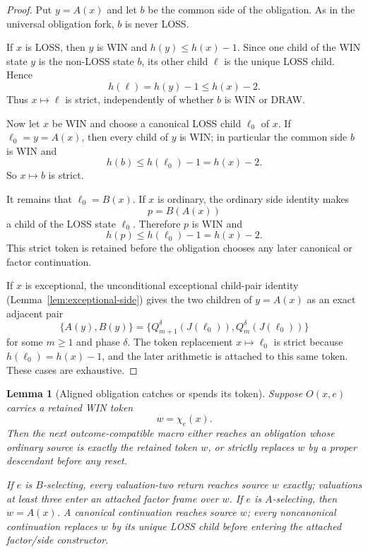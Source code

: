 \documentclass[11pt]{article}
\newtheorem{lemma}[theorem]{Lemma}
\begin{document}
\begin{proof}
Put $y=A(x)$ and let $b$ be the common side of the obligation.  As in the
universal obligation fork, $b$ is never LOSS.

If $x$ is LOSS, then $y$ is WIN and $h(y)\le h(x)-1$.  Since one child of
the WIN state $y$ is the non-LOSS state $b$, its other child $\ell$ is the
unique LOSS child.  Hence
\[
 h(\ell)=h(y)-1\le h(x)-2.
\]
Thus $x\mapsto\ell$ is strict, independently of whether $b$ is WIN or DRAW.

Now let $x$ be WIN and choose a canonical LOSS child $\ell_0$ of $x$.
If $\ell_0=y=A(x)$, then every child of $y$ is WIN; in particular the common
side $b$ is WIN and
\[
 h(b)\le h(\ell_0)-1=h(x)-2.
\]
So $x\mapsto b$ is strict.

It remains that $\ell_0=B(x)$.  If $x$ is ordinary, the ordinary side
identity makes
\[
 p=B(A(x))
\]
a child of the LOSS state $\ell_0$.  Therefore $p$ is WIN and
\[
 h(p)\le h(\ell_0)-1=h(x)-2.
\]
This strict token is retained before the obligation chooses any later
canonical or factor continuation.

If $x$ is exceptional, the unconditional exceptional child-pair identity
(Lemma~\ref{lem:exceptional-side}) gives the two children of $y=A(x)$ as an
exact adjacent pair
\[
 \{A(y),B(y)\}
 =\{Q_{m+1}^{\delta}(J(\ell_0)),Q_m^{\delta}(J(\ell_0))\}
\]
for some $m\ge1$ and phase $\delta$.  The token replacement
$x\mapsto\ell_0$ is strict because $h(\ell_0)=h(x)-1$, and the later
arithmetic is attached to this same token.  These cases are exhaustive.
\end{proof}

\begin{lemma}[Aligned obligation catches or spends its token]
\label{lem:aligned-catch}
Suppose $O(x,e)$ carries a retained WIN token
\[
 w=\chi_e(x).
\]
Then the next outcome-compatible macro either reaches an obligation whose
ordinary source is exactly the retained token $w$, or strictly replaces
$w$ by a proper descendant before any reset.

If $e$ is $B$-selecting, every valuation-two return reaches source $w$
exactly; valuations at least three enter an attached factor frame over $w$.
If $e$ is $A$-selecting, then $w=A(x)$.  A canonical continuation reaches
source $w$; every noncanonical continuation replaces $w$ by its unique LOSS
child before entering the attached factor/side constructor.
\end{lemma}
\end{document}
